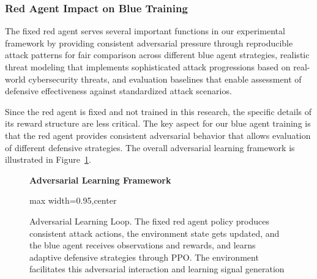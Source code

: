 \documentclass[12pt,oneside]{article}
\begin{document}
\subsubsection{Red Agent Impact on Blue Training}
The fixed red agent serves several important functions in our experimental framework by providing consistent adversarial pressure through reproducible attack patterns for fair comparison across different blue agent strategies, realistic threat modeling that implements sophisticated attack progressions based on real-world cybersecurity threats, and evaluation baselines that enable assessment of defensive effectiveness against standardized attack scenarios.

Since the red agent is fixed and not trained in this research, the specific details of its reward structure are less critical. The key aspect for our blue agent training is that the red agent provides consistent adversarial behavior that allows evaluation of different defensive strategies. The overall adversarial learning framework is illustrated in Figure~\ref{fig:adversarial_framework}.

\begin{figure}[H]
\centering
\textbf{Adversarial Learning Framework}
\medskip
\begin{adjustbox}{max width=0.95\linewidth,center}
\end{adjustbox}
\caption{Adversarial Learning Loop. The fixed red agent policy produces consistent attack actions, the environment state gets updated, and the blue agent receives observations and rewards, and learns adaptive defensive strategies through PPO. The environment facilitates this adversarial interaction and learning signal generation }
\label{fig:adversarial_framework}
\end{figure}
\end{document}
